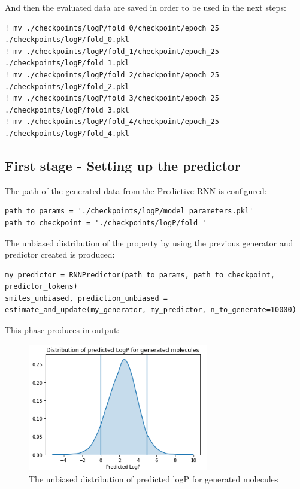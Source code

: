\documentclass[a4paper]{article}
\begin{document}
And then the evaluated data are saved in order to be used in the next steps:

\begin{lstlisting}
! mv ./checkpoints/logP/fold_0/checkpoint/epoch_25 ./checkpoints/logP/fold_0.pkl
! mv ./checkpoints/logP/fold_1/checkpoint/epoch_25 ./checkpoints/logP/fold_1.pkl
! mv ./checkpoints/logP/fold_2/checkpoint/epoch_25 ./checkpoints/logP/fold_2.pkl
! mv ./checkpoints/logP/fold_3/checkpoint/epoch_25 ./checkpoints/logP/fold_3.pkl
! mv ./checkpoints/logP/fold_4/checkpoint/epoch_25 ./checkpoints/logP/fold_4.pkl
\end{lstlisting}

\subsection{First stage - Setting up the predictor}\label{sec:First stage - Setting up the predictor}

The path of the generated data from the Predictive RNN is configured:

\begin{lstlisting}
path_to_params = './checkpoints/logP/model_parameters.pkl'
path_to_checkpoint = './checkpoints/logP/fold_'
\end{lstlisting}

The unbiased distribution of the property by using the previous generator and predictor created is produced:

\begin{lstlisting}
my_predictor = RNNPredictor(path_to_params, path_to_checkpoint, predictor_tokens)
smiles_unbiased, prediction_unbiased = estimate_and_update(my_generator, my_predictor, n_to_generate=10000)
\end{lstlisting}

This phase produces in output:

\begin{figure}[htbp]
    \centering
        \includegraphics[width=0.70\textwidth]{unbiased.png}
    \caption{The unbiased distribution of predicted logP for generated molecules}
    \label{fig:unbiased}
\end{figure}
\end{document}
